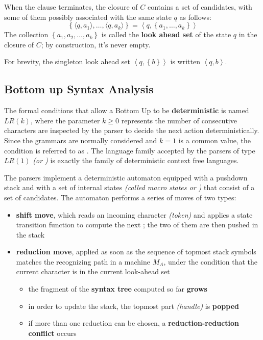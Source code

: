 \documentclass[english]{article}
\begin{document}
When the clause terminates, the closure of \(C\) contains a set of candidates, with some of them possibly associated with the same state \(q\) as follows:
\[ \left\{ \langle q, a_1 \rangle, \ldots, \langle q, a_k \rangle \right\} = \left\langle q, \left\{ a_1, \ldots, a_k \right\} \right\rangle \]
The collection \(\left\{ a_1, a_2, \ldots, a_k \right\}\) is called the \textbf{look ahead set} of the state \(q\) in the closure of \(C\);
by construction, it's never empty.

For brevity, the singleton look ahead set \(\left\langle q, \left\{ b \right\} \right\rangle\) is written \(\left\langle q, b \right\rangle\).

\subsection{Bottom up Syntax Analysis}

The formal conditions that allow a Bottom Up to be \textbf{deterministic} is named \(\textit{LR}(k)\), where the parameter \(k \geq 0\) represents the number of consecutive characters are inspected by the parser to decide the next action deterministically.
Since the \EBNF grammars are normally considered and \(k=1\) is a common value, the condition is referred to as \ELRo.
The language family accepted by the parsers of type \(\textit{LR}(1)\) \textit{(or \ELRo)} is exactly the family \DET of deterministic context free languages.

The \ELRo parsers implement a deterministic automaton equipped with a pushdown stack and with a set of internal states \textit{(called macro states or \mstates)} that consist of a set of candidates.
The automaton performs a series of moves of two types:

\begin{itemize}
  \item \textbf{shift move}, which reads an incoming character \textit{(token)} and applies a state transition function to compute the next \mstate; the two of them are then pushed in the stack
  \item \textbf{reduction move}, applied as soon as the sequence of topmost stack symbols matches the recognizing path in a machine \(M_A\), under the condition that the current character is in the current look-ahead set
        \begin{itemize}[label=\(\rightarrow\)]
          \item the fragment of the \textbf{syntax tree} computed so far \textbf{grows}
          \item in order to update the stack, the topmost part \textit{(handle)} is \textbf{popped}
          \item if more than one reduction can be chosen, a \textbf{reduction-reduction conflict} occurs
        \end{itemize}
\end{itemize}
\end{document}
